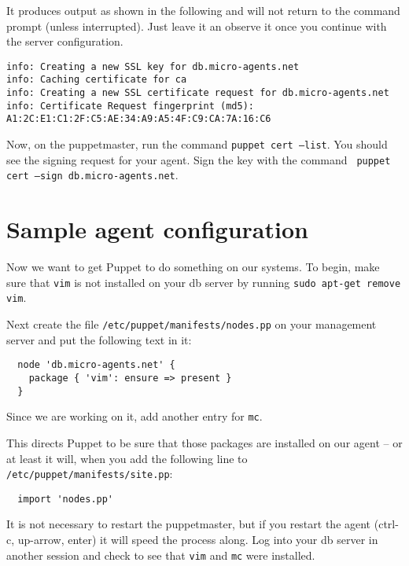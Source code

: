 \documentclass{article}
\newcommand{\domain}{micro-agents.net}
\begin{document}
It produces output as shown in the following and will not return to the command prompt (unless interrupted). Just leave it an observe it once you continue with the server configuration.

\begin{verbatim}
info: Creating a new SSL key for db.micro-agents.net
info: Caching certificate for ca
info: Creating a new SSL certificate request for db.micro-agents.net
info: Certificate Request fingerprint (md5): A1:2C:E1:C1:2F:C5:AE:34:A9:A5:4F:C9:CA:7A:16:C6

\end{verbatim}

Now, on the puppetmaster, run the command \texttt{puppet cert --list}.  You should see the signing request for your agent.  Sign the key with the command \texttt{ puppet cert --sign db.\domain}.

\section{Sample agent configuration}
Now we want to get Puppet to do something on our systems.  To begin, make sure that \texttt{vim} is not installed on your db server by running \texttt{sudo apt-get remove vim}. 

Next create the file \texttt{/etc/puppet/manifests/nodes.pp} on your management server and put the following text in it:
\begin{verbatim}
  node 'db.micro-agents.net' {
    package { 'vim': ensure => present }
  }
\end{verbatim}

Since we are working on it, add another entry for \texttt{mc}.

This directs Puppet to be sure that those packages are installed on our agent -- or at least it will, when you add the following line to \texttt{/etc/puppet/manifests/site.pp}:

\begin{verbatim}
  import 'nodes.pp'
\end{verbatim}

It is not necessary to restart the puppetmaster, but if you restart the agent (ctrl-c, up-arrow, enter) it will speed the process along.  Log into your db server in another session and check to see that \texttt{vim} and \texttt{mc} were installed. 
\end{document}

